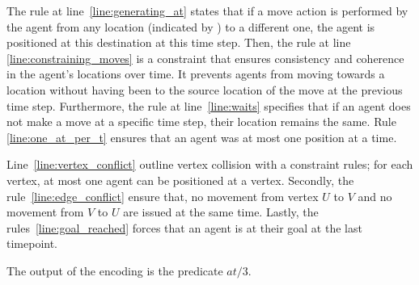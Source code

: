 The rule at line~\ref{line:generating_at} states that if a move action is performed by the agent from any location (indicated by \textunderscore) to a different one, the agent is positioned at this destination at this time step.
Then, the rule at line \ref{line:constraining_moves} is a constraint that ensures consistency and coherence in the agent's locations over time. It prevents agents from moving towards a location without having been to the source location of the move at the previous time step. 
Furthermore, the rule at line~\ref{line:waits} specifies that if an agent does not make a move at a specific time step, their location remains the same. 
Rule \ref{line:one_at_per_t} ensures that an agent was at most one position at a time.

Line~\ref{line:vertex_conflict} outline vertex collision with a constraint rules;  for each vertex, at most one agent can be positioned at a vertex.
Secondly, the rule~\ref{line:edge_conflict} ensure that, no movement from vertex \(U\) to \(V\) and no movement from \(V\) to \(U\) are issued at the same time.
Lastly, the rules~\ref{line:goal_reached} forces that an agent is at their goal at the last timepoint.

The output of the encoding is the predicate \(at/3\). 
